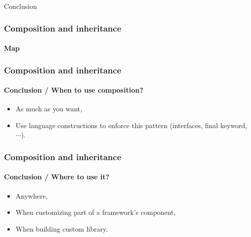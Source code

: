 \begin{sepframe}{Conclusion}{}
\end{sepframe}

\begin{frame}[fragile,c]
    \frametitle{Composition and inheritance}
    \framesubtitle{Map}

\end{frame}

\begin{frame}
    \frametitle{Composition and inheritance}
    \framesubtitle{Conclusion / When to use composition?}

    \begin{itemize}[<+->]
        \item As much as you want,
        \item Use language constructions to enforce this pattern (interfaces, final keyword, $\cdots$).
    \end{itemize}
\end{frame}

\begin{frame}
    \frametitle{Composition and inheritance}
    \framesubtitle{Conclusion / Where to use it?}

    \begin{itemize}[<+->]
        \item Anywhere,
        \item When customizing part of a framework's component,
        \item When building custom library.
    \end{itemize}
\end{frame}

